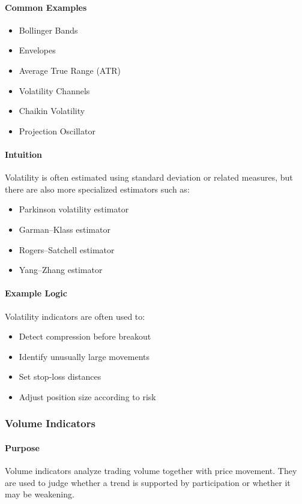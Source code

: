 \documentclass[12pt,openany]{book}
\begin{document}
\paragraph{Common Examples}
\begin{itemize}[leftmargin=*]
    \item Bollinger Bands
    \item Envelopes
    \item Average True Range (ATR)
    \item Volatility Channels
    \item Chaikin Volatility
    \item Projection Oscillator
\end{itemize}

\paragraph{Intuition}
Volatility is often estimated using standard deviation or related measures, but there are also more specialized estimators such as:

\begin{itemize}[leftmargin=*]
    \item Parkinson volatility estimator
    \item Garman--Klass estimator
    \item Rogers--Satchell estimator
    \item Yang--Zhang estimator
\end{itemize}

\paragraph{Example Logic}
Volatility indicators are often used to:

\begin{itemize}[leftmargin=*]
    \item Detect compression before breakout
    \item Identify unusually large movements
    \item Set stop-loss distances
    \item Adjust position size according to risk
\end{itemize}

\subsubsection{Volume Indicators}

\paragraph{Purpose}
Volume indicators analyze trading volume together with price movement. They are used to judge whether a trend is supported by participation or whether it may be weakening.
\end{document}
